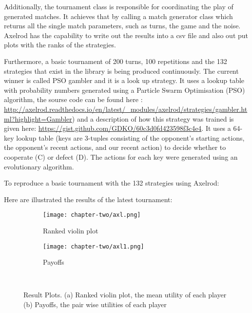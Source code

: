 Additionally, the tournament class is responsible for coordinating the play of
generated matches. It achieves that by calling a match generator class which
returns all the single match parameters, such as turns, the game and the noise.
Axelrod has the capability to write out the results into a csv file and also out
put plots with the ranks of the strategies.

Furthermore, a basic tournament of 200 turns, 100 repetitions and the 132
strategies that exist in the library is being produced continuously. The current
winner is called PSO gambler and it is a look up strategy. It uses a lookup
table with probability numbers generated using a Particle Swarm Optimisation
(PSO) algorithm, the sourse code can be found here :
 \url{http://axelrod.readthedocs.io/en/latest/_modules/axelrod/strategies/gambler.html?highlight=Gambler})
 and a description of how this strategy was trained is given here:
 \url{https://gist.github.com/GDKO/60c3d0fd423598f3c4e4}.
It uses a 64-key lookup table (keys are 3-tuples consisting of the opponent's
starting actions, the opponent's recent actions, and our recent action) to
decide whether to cooperate (C) or defect (D). The actions for each key were
generated using an evolutionary algorithm.

To reproduce a basic tournament with the 132 strategies using Axelrod:


 Here are illustrated the results of the latest tournament:

\begin{figure}[H]
\centering
    \begin{subfigure}[t]{0.7\textwidth}
    \centering
        \texttt{[image: chapter-two/axl.png]}
    \caption{Ranked violin plot}
    \end{subfigure}
\hfill
    \begin{subfigure}[t]{0.70\textwidth}\centering
    \centering
        \texttt{[image: chapter-two/axl1.png]}
    \caption{Payoffs}
    \end{subfigure}
~
\caption{Result Plots. (a) Ranked violin plot, the mean utility of each player
(b) Payoffs, the pair wise utilities of each player}
\label{fig:axelrodplots}
\end{figure}

